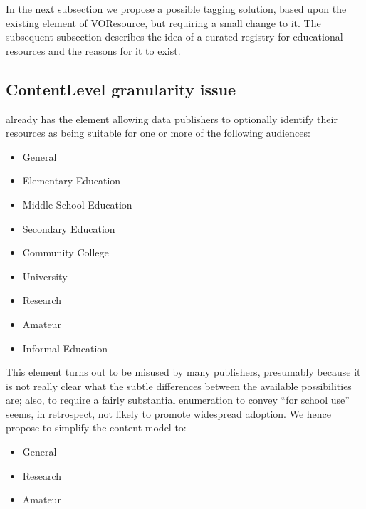 \documentclass{ivoa}
\begin{document}
In the next subsection we propose a possible tagging solution, based upon 
the existing 
element of VOResource, but requiring a small change
to it. The subsequent subsection describes the idea of a
curated registry for educational resources and the reasons for it to exist.
  


\subsection{ContentLevel granularity issue}

\label{sect:contentlvl}

\citep{2008ivoa.spec.0222P} already has the 
element
allowing data publishers to optionally identify their resources as being 
suitable for one or more of the following audiences:


\begin{itemize}

\item General{}

\item Elementary Education{}

\item Middle School Education{}

\item Secondary Education{}

\item Community College{}

\item University{}

\item Research{}

\item Amateur{}

\item Informal Education{}

\end{itemize}

This element turns out to be misused by many publishers, presumably because
it is not really clear what the subtle differences between the available
possibilities are; also, to require a fairly substantial enumeration to
convey ``for school use'' seems, in retrospect, not likely to promote
widespread adoption. We hence propose to simplify the content model
to:


\begin{itemize}

\item General{}

\item Research{}

\item Amateur{}

\end{itemize}
\end{document}
